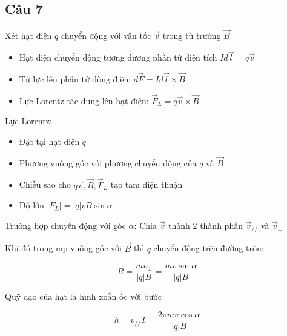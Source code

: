 \subsection{Câu 7}

Xét hạt điện $q$ chuyển động với vận tốc $\vec{v}$ trong từ trường $\vec{B}$

\begin{itemize}
  \item Hạt điện chuyển động tương đương phần từ điện tích $Id\vec{l} = q\vec{v}$
  \item Từ lực lên phần tử dòng điện: $d\vec{F} = Id\vec{l} \times \vec{B}$
  \item Lực Lorentz tác dụng lên hạt điện: $\vec{F}_L = q\vec{v} \times \vec{B}$
\end{itemize}

Lực Lorentz: 

\begin{itemize}
  \item Đặt tại hạt điện $q$
  \item Phương vuông góc với phương chuyển động của $q$ và $\vec{B}$
  \item Chiều sao cho $q\vec{v}, \vec{B}, \vec{F}_L$ tạo tam diện thuận
  \item Độ lớn $|F_L| = |q|vB\sin\alpha$
\end{itemize}

Trường hợp chuyển động với góc $\alpha$: Chia $\vec{v}$ thành 2 thành phần $\vec{v}_{//}$ và $\vec{v}_{\perp}$

Khi đó trong mp vuông góc với $\vec{B}$ thì $q$ chuyển động trên đường tròn:

\begin{equation*}
  R = \frac{mv_{\perp}}{|q|B} = \frac{mv\sin\alpha}{|q|B}
\end{equation*}

Quỹ đạo của hạt là hình xoắn ốc với bước

\begin{equation*}
  h = v_{//}T = \frac{2\pi mv\cos\alpha}{|q|B}
\end{equation*}